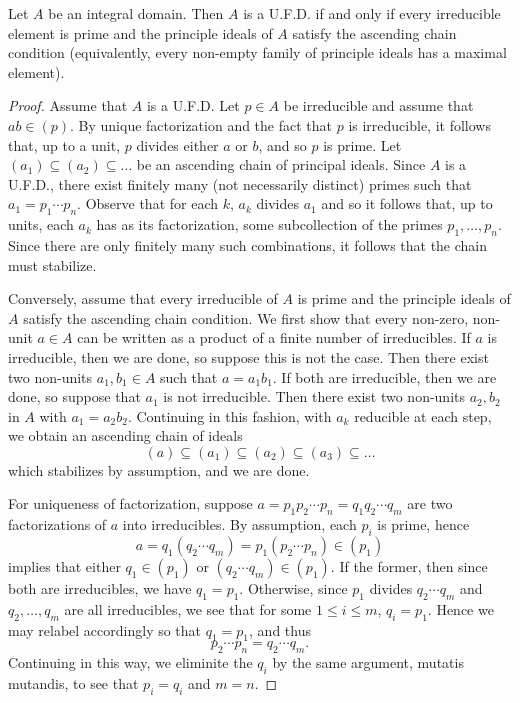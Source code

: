 \documentclass[10pt]{amsart}
\begin{document}
\begin{thm}
  Let $A$ be an integral domain.
  Then $A$ is a U.F.D. if and only if every irreducible element is prime and the principle ideals of $A$ satisfy the ascending chain condition (equivalently, every non-empty family of principle ideals has a maximal element).

  \begin{proof}
    Assume that $A$ is a U.F.D.
    Let $p \in A$ be irreducible and assume that $ab \in (p)$.
    By unique factorization and the fact that $p$ is irreducible, it follows that, up to a unit, $p$ divides either $a$ or $b$, and so $p$ is prime.
    Let $(a_1) \subseteq (a_2) \subseteq \ldots$ be an ascending chain of principal ideals.
    Since $A$ is a U.F.D., there exist finitely many (not necessarily distinct) primes such that $a_1 = p_1 \cdots p_n$.
    Observe that for each $k$, $a_k$ divides $a_1$ and so it follows that, up to units, each $a_k$ has as its factorization, some subcollection of the primes $p_1, \ldots, p_n$.
    Since there are only finitely many such combinations, it follows that the chain must stabilize.
    
    Conversely, assume that every irreducible of $A$ is prime and the principle ideals of $A$ satisfy the ascending chain condition.
    We first show that every non-zero, non-unit $a \in A$ can be written as a product of a finite number of irreducibles.
    If $a$ is irreducible, then we are done, so suppose this is not the case.
    Then there exist two non-units $a_1, b_1 \in A$ such that $a = a_1b_1$.
    If both are irreducible, then we are done, so suppose that $a_1$ is not irreducible.
    Then there exist two non-units $a_2, b_2$ in $A$ with $a_1 = a_2b_2$.
    Continuing in this fashion, with $a_k$ reducible at each step, we obtain an ascending chain of ideals
    $$(a) \subseteq (a_1) \subseteq (a_2) \subseteq (a_3) \subseteq \ldots$$
    which stabilizes by assumption, and we are done.
    
    For uniqueness of factorization, suppose $a = p_1 p_2 \cdots p_n = q_1 q_2 \cdots q_m$ are two factorizations of $a$ into irreducibles.
    By assumption, each $p_i$ is prime, hence 
    $$a = q_1(q_2 \cdots q_m) = p_1(p_2 \cdots p_n) \in (p_1)$$
    implies that either $q_1 \in (p_1)$ or $(q_2 \cdots q_m) \in (p_1)$.
    If the former, then since both are irreducibles, we have $q_1 = p_1$.
    Otherwise, since $p_1$ divides $q_2 \cdots q_m$ and $q_2, \ldots, q_m$ are all irreducibles, we see that for some $1 \leq i \leq m$, $q_i = p_1$.
    Hence we may relabel accordingly so that $q_1 = p_1$, and thus
    $$p_2 \cdots p_n = q_2 \cdots q_m.$$
    Continuing in this way, we eliminite the $q_i$ by the same argument, mutatis mutandis, to see that $p_i = q_i$ and $m = n$.
  \end{proof}
\end{thm}
\end{document}
